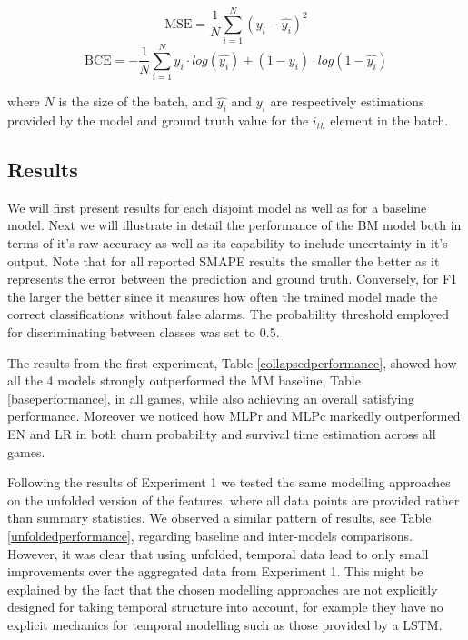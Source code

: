 \begin{equation}
\label{mae}
    \text{MSE}=
        \dfrac
            {1}
            {N}
            \sum\limits_{i=1}^{N}  (y_i - \hat{y_i})^2
\end{equation}
\begin{equation}
\label{bce}
    \text{BCE}=
        -\dfrac
            {1}
            {N}
        \sum\limits_{i=1}^{N}  y_i \cdot log(\hat{y_i}) + (1-y_i) \cdot log(1 - \hat{y_i})
\end{equation}

where $N$ is the size of the batch, and $\hat{y_i}$ and $y_i$ are respectively estimations provided by the model and ground truth value for the $i_{th}$ element in the batch. 

\subsection{Results}
We will first present results for each disjoint model as well as for a baseline model. Next we will illustrate in detail the performance of the BM model both in terms of it's raw accuracy as well as its capability to include uncertainty in it's output. Note that for all reported SMAPE results the smaller the better as it represents the error between the prediction and ground truth. Conversely, for F1 the larger the better since it measures how often the trained model made the correct classifications without false alarms. The probability threshold employed for discriminating between classes was set to 0.5.

The results from the first experiment, Table \ref{collapsedperformance}, showed how all the 4 models strongly outperformed the MM baseline, Table \ref{baseperformance}, in all games, while also achieving an overall satisfying performance. Moreover we noticed how MLPr and MLPc markedly outperformed EN and LR in both churn probability and survival time estimation across all games.  

Following the results of Experiment 1 we tested the same modelling approaches on the unfolded version of the features, where all data points are provided rather than summary statistics. We observed a similar pattern of results, see Table \ref{unfoldedperformance}, regarding baseline and inter-models comparisons. However, it was clear that using unfolded, temporal data lead to only small improvements over the aggregated data from Experiment 1. This might be explained by the fact that the chosen modelling approaches are not explicitly designed for taking temporal structure into account, for example they have no explicit mechanics for temporal modelling such as those provided by a LSTM.
